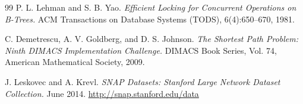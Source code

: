 \documentclass[12pt,a4paper,openany,oneside]{report}
\theoremstyle{plain}
\numberwithin{equation}{section}
\begin{document}
\begin{thebibliography}{99}
P. L. Lehman and S. B. Yao.
\textit{Efficient Locking for Concurrent Operations on B-Trees.}
ACM Transactions on Database Systems (TODS), 6(4):650--670, 1981.

C. Demetrescu, A. V. Goldberg, and D. S. Johnson.
\textit{The Shortest Path Problem: Ninth DIMACS Implementation Challenge.}
DIMACS Book Series, Vol. 74, American Mathematical Society, 2009.

J. Leskovec and A. Krevl.
\textit{SNAP Datasets: Stanford Large Network Dataset Collection.}
June 2014. \url{http://snap.stanford.edu/data}

\end{thebibliography}
\end{document}
